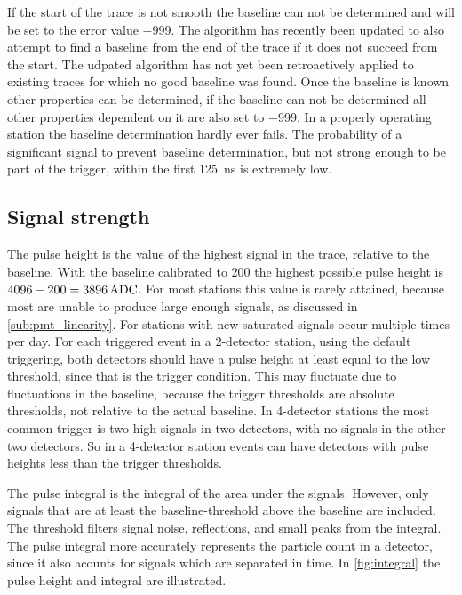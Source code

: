 If the start of the trace is not smooth the baseline can not be determined and will be set to the error value \num{-999}. The algorithm has recently been updated to also attempt to find a baseline from the end of the trace if it does not succeed from the start. The udpated algorithm has not yet been retroactively applied to existing traces for which no good baseline was found. Once the baseline is known other properties can be determined, if the baseline can not be determined all other properties dependent on it are also set to \num{-999}. In a properly operating station the baseline determination hardly ever fails. The probability of a significant signal to prevent baseline determination, but not strong enough to be part of the trigger, within the first \SI{125}{\ns} is extremely low.


\subsection{Signal strength}

The pulse height is the value of the highest signal in the trace, relative to the baseline. With the baseline calibrated to \SI{200}{\adc} the highest possible pulse height is $4096 - 200 = \SI{3896}{\adc}$. For most stations this value is rarely attained, because most \pmts are unable to produce large enough signals, as discussed in \cref{sub:pmt_linearity}. For stations with new \pmts saturated signals occur multiple times per day. For each triggered event in a 2-detector station, using the default triggering, both detectors should have a pulse height at least equal to the low threshold, since that is the trigger condition. This may fluctuate due to fluctuations in the baseline, because the trigger thresholds are absolute thresholds, not relative to the actual baseline. In 4-detector stations the most common trigger is two high signals in two detectors, with no signals in the other two detectors. So in a 4-detector station events can have detectors with pulse heights less than the trigger thresholds.

The pulse integral is the integral of the area under the signals. However, only signals that are at least the baseline-threshold above the baseline are included. The threshold filters signal noise, reflections, and small peaks from the integral. The pulse integral more accurately represents the particle count in a detector, since it also acounts for signals which are separated in time. In \cref{fig:integral} the pulse height and integral are illustrated.

